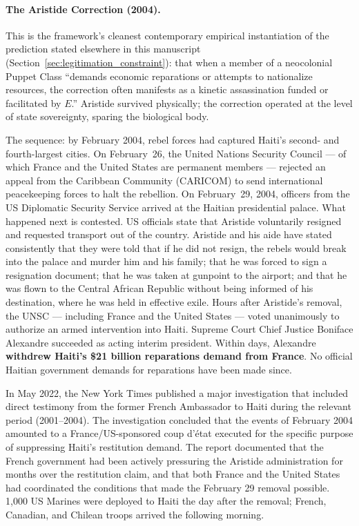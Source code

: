 \paragraph{The Aristide Correction (2004).}
\label{par:aristide_correction}

This is the framework's cleanest contemporary empirical instantiation of the prediction stated elsewhere in this manuscript (Section~\ref{sec:legitimation_constraint}): that when a member of a neocolonial Puppet Class ``demands economic reparations or attempts to nationalize resources, the correction often manifests as a kinetic assassination funded or facilitated by $E$.'' Aristide survived physically; the correction operated at the level of state sovereignty, sparing the biological body.

The sequence: by February 2004, rebel forces had captured Haiti's second- and fourth-largest cities. On February~26, the United Nations Security Council --- of which France and the United States are permanent members --- rejected an appeal from the Caribbean Community (CARICOM) to send international peacekeeping forces to halt the rebellion. On February~29, 2004, officers from the US Diplomatic Security Service arrived at the Haitian presidential palace. What happened next is contested. US officials state that Aristide voluntarily resigned and requested transport out of the country. Aristide and his aide have stated consistently that they were told that if he did not resign, the rebels would break into the palace and murder him and his family; that he was forced to sign a resignation document; that he was taken at gunpoint to the airport; and that he was flown to the Central African Republic without being informed of his destination, where he was held in effective exile. Hours after Aristide's removal, the UNSC --- including France and the United States --- voted unanimously to authorize an armed intervention into Haiti. Supreme Court Chief Justice Boniface Alexandre succeeded as acting interim president. Within days, Alexandre \textbf{withdrew Haiti's \$21 billion reparations demand from France}. No official Haitian government demands for reparations have been made since.

In May 2022, the New York Times published a major investigation \cite{nyt_aristide_coup_2022} that included direct testimony from the former French Ambassador to Haiti during the relevant period (2001--2004). The investigation concluded that the events of February 2004 amounted to a France/US-sponsored coup d'\'{e}tat executed for the specific purpose of suppressing Haiti's restitution demand. The report documented that the French government had been actively pressuring the Aristide administration for months over the restitution claim, and that both France and the United States had coordinated the conditions that made the February 29 removal possible. 1,000 US Marines were deployed to Haiti the day after the removal; French, Canadian, and Chilean troops arrived the following morning.

